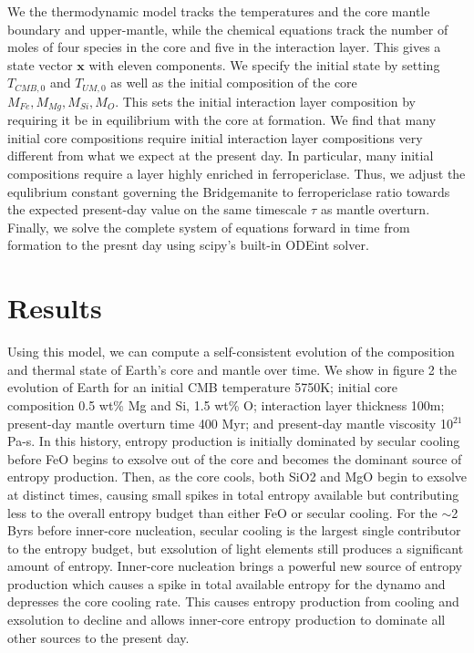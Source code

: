 \documentclass[]{article}
\begin{document}
	We the thermodynamic model tracks the temperatures and the core mantle boundary and upper-mantle, while the chemical equations track the number of moles of four species in the core and five in the interaction layer. This gives a state vector $\mathbf{x}$ with eleven components. We specify the initial state by setting \(T_{CMB,0}\) and \(T_{UM,0}\) as well as the initial composition of the core \(M_{Fe}, M_{Mg}, M_{Si}, M_{O}\). This sets the initial interaction layer composition by requiring it be in equilibrium with the core at formation. We find that many initial core compositions require initial interaction layer compositions very different from what we expect at the present day. In particular, many initial compositions require a layer highly enriched in ferropericlase. Thus, we adjust the equlibrium constant governing the Bridgemanite to ferropericlase ratio towards the expected present-day value on the same timescale \(\tau\) as mantle overturn. Finally, we solve the complete system of equations forward in time from formation to the presnt day using scipy's built-in ODEint solver.
	
	\section{Results}\label{results}
	Using this model, we can compute a self-consistent evolution of the composition and thermal state of Earth's core and mantle over time. We show in figure 2 the evolution of Earth for an initial CMB temperature 5750K; initial core composition 0.5 wt\% Mg and Si, 1.5 wt\% O; interaction layer thickness 100m; present-day mantle overturn time  400 Myr; and present-day mantle viscosity 10$^{21}$Pa-s. In this history, entropy production is initially dominated by secular cooling before FeO begins to exsolve out of the core and becomes the dominant source of entropy production. Then, as the core cools, both SiO2 and MgO begin to exsolve at distinct times, causing small spikes in total entropy available but contributing less to the overall entropy budget than either FeO or secular cooling. For the $\sim$2 Byrs before inner-core nucleation, secular cooling is the largest single contributor to the entropy budget, but exsolution of light elements still produces a significant amount of entropy. Inner-core nucleation brings a powerful new source of entropy production which causes a spike in total available entropy for the dynamo and depresses the core cooling rate. This causes entropy production from cooling and exsolution to decline and allows inner-core entropy production to dominate all other sources to the present day.
	
\end{document}
